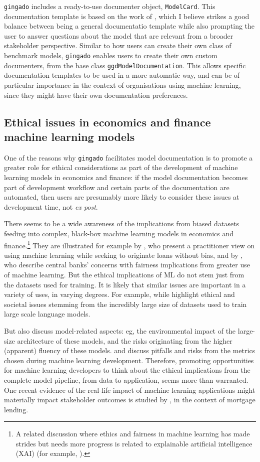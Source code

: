 \documentclass{article}
\begin{document}
\texttt{gingado} includes a ready-to-use documenter object, \texttt{ModelCard}. This documentation template is based on the work of \cite{ModelCards}, which I believe strikes a good balance between being a general documentatio template while also prompting the user to answer questions about the model that are relevant from a broader stakeholder perspective. Similar to how users can create their own class of benchmark models, \texttt{gingado} enables users to create their own custom documenters, from the base class \texttt{ggdModelDocumentation}. This allows specific documentation templates to be used in a more automatic way, and can be of particular importance in the context of organisations using machine learning, since they might have their own documentation preferences.

\subsection{Ethical issues in economics and finance machine learning models}
One of the reasons why \texttt{gingado} facilitates model documentation is to promote a greater role for ethical considerations as part of the development of machine learning models in economics and finance: if the model documentation becomes part of development workflow and certain parts of the documentation are automated, then users are presumably more likely to consider these issues at development time, not \textit{ex post}.

There seems to be a wide awareness of the implications from biased datasets feeding into complex, black-box machine learning models in economics and finance.\footnote{A related discussion where ethics and fairness in machine learning has made strides but needs more progress is related to explainable artificial intelligence (XAI) (for example, \cite{BARREDOARRIETA202082}).} They are illustrated for example by \cite{jrfm15040165}, who present a practitioner view on using machine learning while seeking to originate loans without bias, and by \cite{doerr2021big}, who describe central banks' concerns with fairness implications from greater use of machine learning. But the ethical implications of ML do not stem just from the datasets used for training. It is likely that similar issues are important in a variety of uses, in varying degrees. For example, while \cite{Parrots} highlight ethical and societal issues stemming from the incredibly large size of datasets used to train large scale language models. 

But \cite{Parrots} also discuss model-related aspects: eg, the environmental impact of the large-size architecture of these models, and the risks originating from the higher (apparent) fluency of these models. \cite{automateMH} and \cite{thomas2022reliance} discuss pitfalls and risks from the metrics chosen during machine learning development. Therefore, promoting opportunities for machine learning developers to think about the ethical implications from the complete model pipeline, from data to application, seems more than warranted. One recent evidence of the real-life impact of machine learning applications might materially impact stakeholder outcomes is studied by \cite{predunequal}, in the context of mortgage lending. 
\end{document}
